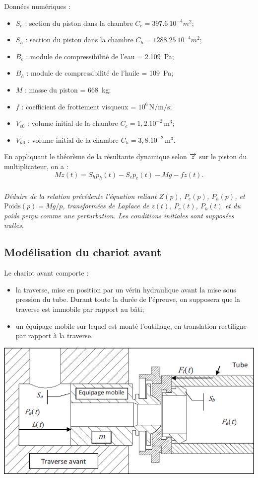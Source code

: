 \documentclass[10pt,fleqn]{article} %
\begin{document}
\begin{multicols}{2}
Données numériques : 
\begin{itemize}
\item $S_e$ :	section du piston dans la chambre $C_e = \SI{397,6}{10^{-4}m^2}$;
\item $S_h$ :	section du piston dans la chambre $C_h = \SI{1288,25}{10^{-4}m^2}$;
\item $B_e$ :	module de compressibilité de l’eau = \SI{2.109}{Pa};
\item $B_h$ :	module de compressibilité de l’huile = \SI{109}{Pa};
\item $M$ :	masse du piston = \SI{668}{kg};
\item $f$ :	coefficient de frottement visqueux = $10^6 \, \text{N/m/s}$;
\item $V_{e0}$ :	volume initial de la chambre $C_e =  1,2.10^{-2}\,\text{m}^3$;
\item $V_{h0}$ :	volume initial de la chambre $C_h = 3,8.10^{-2}\,\text{m}^3$.
\end{itemize}
En appliquant le théorème de la résultante dynamique selon $\overrightarrow{z}$ sur le piston du multiplicateur, on a : 
$$
M\ddot{z}(t)=S_hp_h(t)-S_ep_e(t)-Mg-f\dot{z}(t).
$$
\subparagraph{}
\textit{Déduire de la relation précédente l’équation reliant $Z(p)$, $P_e(p)$, $P_h(p)$, et $\text{Poids}(p)=Mg/p$, transformées de Laplace de $z(t)$, $P_e(t)$, $P_h(t)$ et du poids perçu comme une perturbation. Les conditions initiales sont supposées nulles.}

\subsection*{Modélisation du chariot avant}
Le chariot avant comporte :
\begin{itemize}
\item la traverse, mise en position par un vérin hydraulique avant la mise sous pression du tube. Durant toute la durée de l’épreuve, on supposera que la traverse est immobile par rapport au bâti;
\item un équipage mobile sur lequel est monté l’outillage, en translation rectiligne par rapport à la traverse.
\end{itemize}



\begin{center}
\includegraphics[width=\linewidth]{images_02/fig_03}
\end{center}



\end{multicols}
\end{document}
